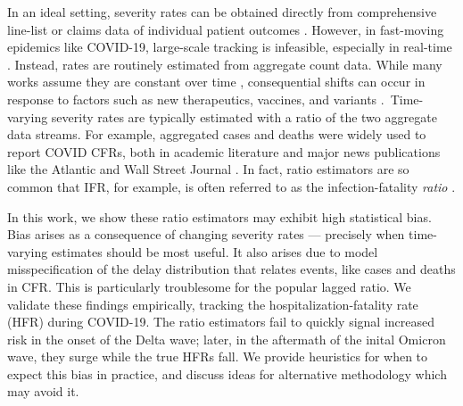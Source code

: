 \documentclass{article}
\newcommand{\djmcomment}[1]{{\color{teal}[DJM: #1]}}
\begin{document}
In an ideal setting, severity rates can be obtained directly from comprehensive line-list or claims data of individual patient outcomes \citep{HFR_line_list1,HFR_linelist2,HFR_linelist3,cfr_line_list}. However, in fast-moving epidemics like COVID-19, large-scale tracking is infeasible, especially in real-time \citep{UKpaper}. Instead, rates are routinely estimated from aggregate count data. While many works assume they are constant over time \citep{reich2012estimating,ghani,jewell2007nonparametric,lancet_controversial}, consequential shifts can occur in response to factors such as new therapeutics, vaccines, and variants \citep{nyt}. Time-varying severity rates are typically estimated with a ratio of the two aggregate data streams.  For example, aggregated cases and deaths were widely used to report COVID CFRs, both in academic literature \citep{germany,horita2022global,timevar_ifr,yuan2020monitoring,LIU2023100350} and major news publications like the Atlantic \citep{atlantic} and Wall Street Journal \citep{wsj}. In fact, ratio estimators are so common that IFR, for example, is often referred to as the infection-fatality \textit{ratio} \citep{timevar_ifr, lancet_ifr}.

In this work, we show these ratio estimators may exhibit high statistical bias. 
Bias %
arises as a consequence of changing severity rates --- precisely when time-varying estimates should be most useful. 
It also arises due to model misspecification of the delay distribution 
that relates events, like cases and deaths in CFR. 
This is particularly troublesome for the popular lagged ratio. 
We validate these findings empirically, tracking the hospitalization-fatality rate (HFR) during COVID-19. The ratio estimators fail to quickly signal increased risk in the onset of the Delta wave; later, in the aftermath of the inital Omicron wave, they surge while the true HFRs fall. 
We provide heuristics for when to expect this bias in practice,
and discuss ideas for alternative methodology which may avoid it.
\end{document}
